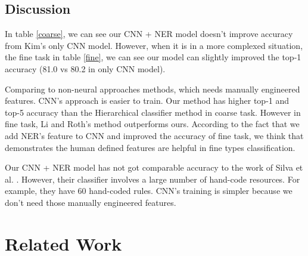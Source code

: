 \documentclass[10pt,twocolumn,letterpaper]{article}
\begin{document}
\begin{table}

\caption{Top-1 and top-5 accuracy for TREC coarse question types.}
\label{fine}
\end{table}

\subsection{Discussion}
In table \ref{coarse}, we can see our CNN + NER model doesn't improve accuracy from Kim's only CNN model. However, when it is in a more complexed situation, the fine task in table \ref{fine}, we can see our model can slightly improved the top-1 accuracy (81.0 vs 80.2 in only CNN model). 

Comparing to non-neural approaches methods, which needs manually engineered features. CNN's approach is easier to train. Our method has higher top-1 and top-5 accuracy than the Hierarchical classifier method in coarse task. However in fine task, Li and Roth's method outperforms ours. According to the fact that we add NER's feature to CNN and improved the accuracy of fine task, we think that demonstrates the human defined features are helpful in fine types classification. 

Our CNN + NER model has not got comparable accuracy to the work of Silva et al. \cite{silva2011symbolic}. However, their classifier involves a large number of hand-code resources. For example, they have 60 hand-coded rules. CNN's training is simpler because we don't need those manually engineered features. 

\section{Related Work}
\end{document}
